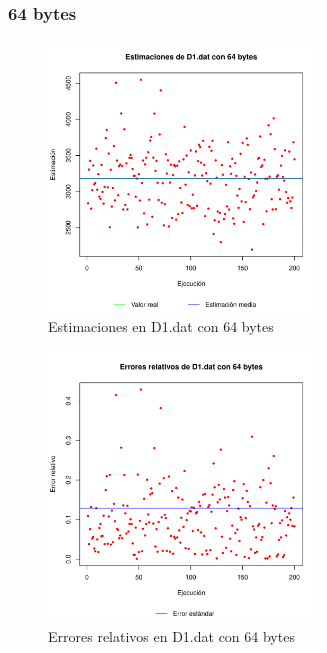 \subsubsection{64 bytes}
\begin{figure}[h!]
    \centering
        \includegraphics[width=0.64\textwidth]{../figs/D1/plot_estimation_64.pdf}
        \caption{Estimaciones en D1.dat con 64 bytes}
    \label{figura:D1_estimation_64}
\end{figure}

\begin{figure}[h!]
    \centering
        \includegraphics[width=0.64\textwidth]{../figs/D1/plot_errors_64.pdf}
        \caption{Errores relativos en D1.dat con 64 bytes}
    \label{figura:D1_errors_64}
\end{figure}

